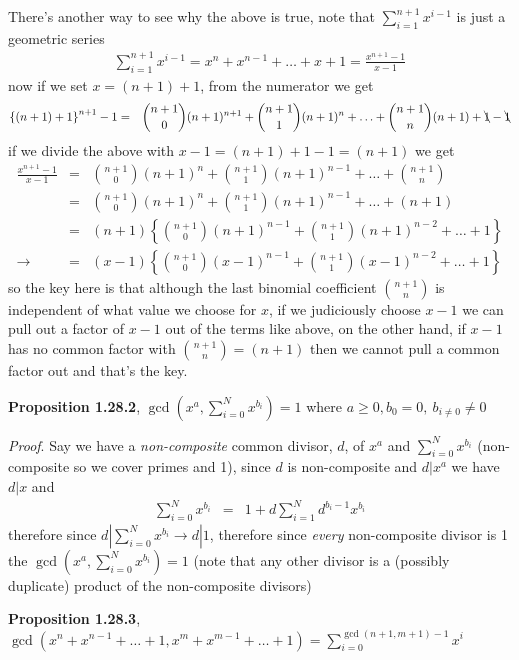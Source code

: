 \documentclass[aps,preprint,preprintnumbers,nofootinbib,showpacs,prd]{revtex4-1}
\newcommand{\nbea}{\begin{eqnarray*}}
\newcommand{\neea}{\end{eqnarray*}}
\begin{document}
There's another way to see why the above is true, note that $\sum_{i=1}^{n+1} x^{i-1}$ is just a geometric series
%
\nbea
\sum_{i=1}^{n+1} x^{i-1} = x^n + x^{n-1} + \dots + x + 1 = \frac{x^{n+1}-1}{x-1}
\neea
%
now if we set $x = (n+1) + 1$, from the numerator we get
%
\nbea
\left\{(n+1)+1\right\}^{n+1} - 1 & = & {n+1\choose 0}(n+1)^{n+1} + {n+1\choose 1}(n+1)^{n} + \ldots + {n+1\choose n}(n+1) + \bcancel{1} - \bcancel{1}
\neea
%
if we divide the above with $x-1 = (n+1) + 1 - 1 = (n+1)$ we get
%
\nbea
\frac{x^{n+1}-1}{x-1} & = & {n+1\choose 0}(n+1)^{n} + {n+1\choose 1}(n+1)^{n-1} + \ldots + {n+1\choose n} \\
& = & {n+1\choose 0}(n+1)^{n} + {n+1\choose 1}(n+1)^{n-1} + \ldots + (n+1) \\
& = & (n+1) \left \{ {n+1\choose 0}(n+1)^{n-1} + {n+1\choose 1}(n+1)^{n-2} + \ldots + 1 \right \} \\
\to & = & (x-1) \left \{ {n+1\choose 0}(x-1)^{n-1} + {n+1\choose 1}(x-1)^{n-2} + \ldots + 1 \right \}
\neea
%
so the key here is that although the last binomial coefficient ${n+1\choose n}$ is independent of what value we choose for $x$, if we judiciously choose $x-1$ we can pull out a factor of $x-1$ out of the terms like above, on the other hand, if $x-1$ has no common factor with ${n+1\choose n}=(n+1)$ then we cannot pull a common factor out and that's the key.

{\bf Proposition 1.28.2}, $\gcd(x^{a}, \sum_{i=0}^{N}x^{b_i})=1$ where $a \ge 0, b_0 = 0, ~b_{i\neq 0} \neq 0$

{\it Proof}. Say we have a {\it non-composite} common divisor, $d$, of $x^a$ and $\sum_{i=0}^{N}x^{b_i}$ (non-composite so we cover primes and 1), since $d$ is non-composite and $d|x^a$ we have $d|x$ and
%
\nbea
\sum_{i=0}^{N}x^{b_i} & = & 1 + d\sum_{i=1}^{N}d^{b_i-1} x^{b_i}
\neea
%
therefore since $d|\sum_{i=0}^{N}x^{b_i} \to d|1$, therefore since {\it every} non-composite divisor is 1 the $\gcd(x^{a}, \sum_{i=0}^{N}x^{b_i})=1$ (note that any other divisor is a (possibly duplicate) product of the non-composite divisors)

{\bf Proposition 1.28.3}, $\gcd(x^n + x^{n-1} + \ldots + 1,x^m + x^{m-1} + \ldots + 1) = \sum_{i=0}^{\gcd(n+1,m+1)-1}x^{i}$
\end{document}
